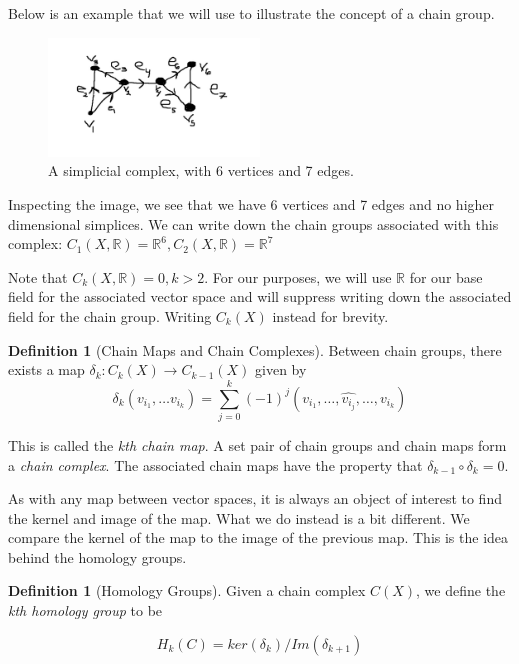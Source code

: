 \documentclass[12pt]{article}
\theoremstyle{plain}
\theoremstyle{definition}
\newtheorem{definition}[thm]{Definition}
\begin{document}
Below is an example that we will use to illustrate the concept of a chain group.

\begin{figure}[ht]
  \begin{center}
      \includegraphics[width=0.5\textwidth]{Simp_Cx.jpg}
  \end{center}
\caption{A simplicial complex, with 6 vertices and 7 edges.}
\end{figure}

Inspecting the image, we see that we have 6 vertices and 7 edges and no higher dimensional simplices. 
We can write down the chain groups associated with this complex: $C_1(X, \mathbb{R}) = \mathbb{R}^6 , C_2(X, \mathbb{R}) = \mathbb{R}^7$


Note that $C_k(X, \mathbb{R}) = 0, k > 2$. For our purposes, we will use $\mathbb{R}$ for our base field for the 
associated vector space and will suppress writing down the associated field for the chain group. Writing 
$C_k(X)$ instead for brevity.

\begin{definition}[Chain Maps and Chain Complexes]Between chain groups, there exists a map $\delta_{k}: C_k(X) \to C_{k-1}(X)$ given by
\begin{equation}
  \delta_k (v_{i_1}, \ldots v_{i_k}) =  \sum_{j = 0}^{k} (-1)^j (v_{i_1}, \ldots, \hat{v_{i_j}} , \ldots, v_{i_k})
\end{equation}

This is called the \textit{kth chain map}. A set pair of chain groups and chain maps form a \textit{chain complex}.
The associated chain maps have the property that $\delta_{k-1} \circ \delta_{k} = 0$. 

\end{definition}

As with any map between vector spaces, it is always an object of interest to find the kernel and image of the map. What we do instead
is a bit different. We compare the kernel of the map to the image of the previous map. This is the idea behind the homology groups.

\begin{definition}[Homology Groups]

Given a chain complex $C(X)$, we define the \textit{kth homology group} to be 

\begin{equation}
H_k(C) = ker(\delta_k) / Im(\delta_{k+1})
\end{equation}

\end{definition}
\end{document}
